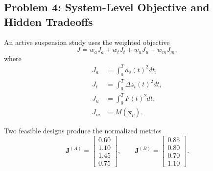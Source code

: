 \subsection*{Problem 4: System-Level Objective and Hidden Tradeoffs}

An active suspension study uses the weighted objective
\begin{equation}
J
=
w_aJ_a
+
w_tJ_t
+
w_uJ_u
+
w_mJ_m,
\end{equation}
where
\begin{align}
J_a&=\int_0^T a_s(t)^2dt,\\
J_t&=\int_0^T \Delta z_t(t)^2dt,\\
J_u&=\int_0^T F(t)^2dt,\\
J_m&=M(\mathbf{x}_p).
\end{align}

Two feasible designs produce the normalized metrics
\begin{equation}
\mathbf{J}^{(A)}
=
\begin{bmatrix}
0.60\\
1.10\\
1.45\\
0.75
\end{bmatrix},
\qquad
\mathbf{J}^{(B)}
=
\begin{bmatrix}
0.85\\
0.80\\
0.70\\
1.10
\end{bmatrix}.
\end{equation}

